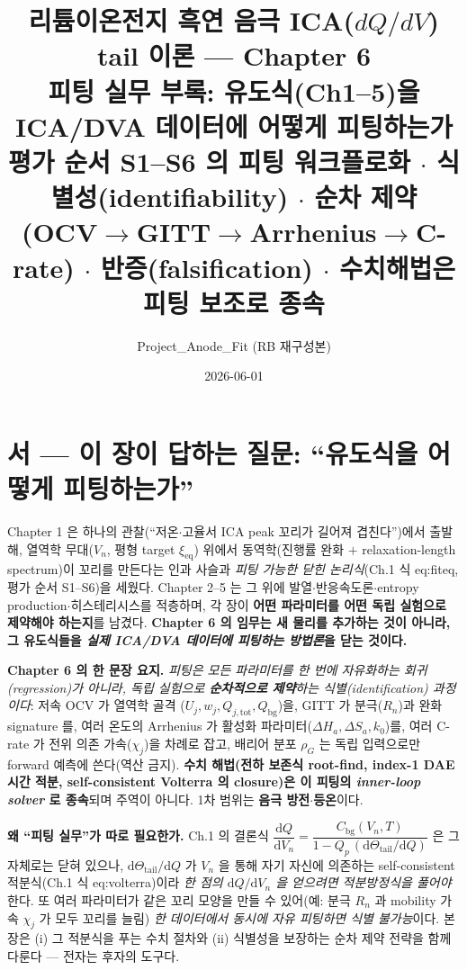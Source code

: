 \documentclass[11pt,a4paper]{article}
\title{\textbf{리튬이온전지 흑연 음극 ICA($dQ/dV$) tail 이론 — Chapter 6}\\[0.4em]
\large 피팅 실무 부록: 유도식(Ch1--5)을 ICA/DVA 데이터에 어떻게 피팅하는가\\[0.2em]
\normalsize 평가 순서 S1--S6 의 피팅 워크플로화 $\cdot$ 식별성(identifiability) $\cdot$ 순차 제약\\
(OCV$\to$GITT$\to$Arrhenius$\to$C-rate) $\cdot$ 반증(falsification) $\cdot$ 수치해법은 피팅 보조로 종속}
\author{Project\_Anode\_Fit (RB 재구성본)}
\date{2026-06-01}
\newcommand{\dd}{\mathrm{d}}
\newcommand{\eq}{\mathrm{eq}}
\newcommand{\bg}{\mathrm{bg}}
\newcommand{\tot}{\mathrm{tot}}
\begin{document}
\sloppy
\maketitle

\section*{서 — 이 장이 답하는 질문: ``유도식을 어떻게 피팅하는가''}
Chapter 1 은 하나의 관찰(``저온$\cdot$고율서 ICA peak 꼬리가 길어져 겹친다'')에서 출발해, 열역학 무대($V_n$,
평형 target $\xi_{\eq}$) 위에서 동역학(진행률 완화 $+$ relaxation-length spectrum)이 꼬리를 만든다는 인과
사슬과 \emph{피팅 가능한 닫힌 논리식}(Ch.1 식 eq:fiteq, 평가 순서 S1--S6)을 세웠다. Chapter 2--5 는 그 위에
발열$\cdot$반응속도론$\cdot$entropy production$\cdot$히스테리시스를 적층하며, 각 장이 \textbf{어떤 파라미터를
어떤 독립 실험으로 제약해야 하는지}를 남겼다. \textbf{Chapter 6 의 임무는 새 물리를 추가하는 것이 아니라, 그
유도식들을 \emph{실제 ICA/DVA 데이터에 피팅하는 방법론}을 닫는 것이다.}

\textbf{Chapter 6 의 한 문장 요지.} \emph{피팅은 모든 파라미터를 한 번에 자유화하는 회귀(regression)가 아니라,
독립 실험으로 \textbf{순차적으로 제약}하는 식별(identification) 과정이다}: 저속 OCV 가 열역학 골격
($U_j,w_j,Q_{j,\tot},Q_\bg$)을, GITT 가 분극($R_n$)과 완화 signature 를, 여러 온도의 Arrhenius 가 활성화
파라미터($\Delta H_a,\Delta S_a,k_0$)를, 여러 C-rate 가 전위 의존 가속($\chi_j$)을 차례로 잡고, 배리어 분포
$\rho_G$ 는 독립 입력으로만 forward 예측에 쓴다(역산 금지). \textbf{수치 해법(전하 보존식 root-find, index-1
DAE 시간 적분, self-consistent Volterra 의 closure)은 이 피팅의 \emph{inner-loop solver} 로 종속}되며 주역이
아니다. 1차 범위는 \textbf{음극 방전$\cdot$등온}이다.

\textbf{왜 ``피팅 실무''가 따로 필요한가.} Ch.1 의 결론식
$\dfrac{\dd Q}{\dd V_n}=\dfrac{C_\bg(V_n,T)}{1-Q_p\,(\dd\Theta_\mathrm{tail}/\dd Q)}$ 은 그 자체로는 닫혀 있으나,
$\dd\Theta_\mathrm{tail}/\dd Q$ 가 $V_n$ 을 통해 자기 자신에 의존하는 self-consistent 적분식(Ch.1 식
eq:volterra)이라 \emph{한 점의 $\dd Q/\dd V_n$ 을 얻으려면 적분방정식을 풀어야} 한다. 또 여러 파라미터가 같은
꼬리 모양을 만들 수 있어(예: 분극 $R_n$ 과 mobility 가속 $\chi_j$ 가 모두 꼬리를 늘림) \emph{한 데이터에서
동시에 자유 피팅하면 식별 불가능}이다. 본 장은 (i) 그 적분식을 푸는 수치 절차와 (ii) 식별성을 보장하는 순차
제약 전략을 함께 다룬다 — 전자는 후자의 도구다.
\end{document}
